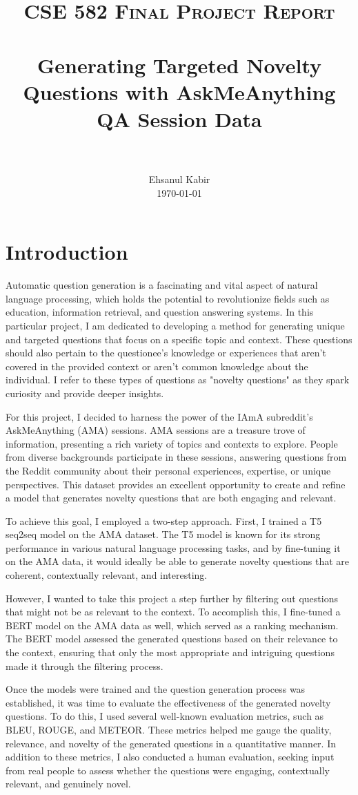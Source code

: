 \documentclass[paper=a4, fontsize=11pt]{scrartcl}
\title{
		\usefont{OT1}{bch}{b}{n}
		\normalfont \normalsize \textsc{CSE 582 Final Project Report} \\ [25pt]
		\horrule{0.5pt} \\[0.4cm]
		\huge Generating Targeted Novelty Questions with AskMeAnything QA Session Data \\
		\horrule{2pt} \\[0.5cm]
}
\author{
		\normalfont 								\normalsize
        Ehsanul Kabir\\[-3pt]		\normalsize
        \today
}
\date{}
\numberwithin{equation}{section}		%
\numberwithin{figure}{section}			%
\numberwithin{table}{section}				%
\begin{document}
\maketitle
\section{Introduction}
Automatic question generation is a fascinating and vital aspect of natural language processing, which holds the potential to revolutionize fields such as education, information retrieval, and question answering systems. In this particular project, I am dedicated to developing a method for generating unique and targeted questions that focus on a specific topic and context. These questions should also pertain to the questionee's knowledge or experiences that aren't covered in the provided context or aren't common knowledge about the individual. I refer to these types of questions as "novelty questions" as they spark curiosity and provide deeper insights.

For this project, I decided to harness the power of the IAmA subreddit's AskMeAnything (AMA) sessions. AMA sessions are a treasure trove of information, presenting a rich variety of topics and contexts to explore. People from diverse backgrounds participate in these sessions, answering questions from the Reddit community about their personal experiences, expertise, or unique perspectives. This dataset provides an excellent opportunity to create and refine a model that generates novelty questions that are both engaging and relevant.

To achieve this goal, I employed a two-step approach. First, I trained a T5 seq2seq model on the AMA dataset. The T5 model is known for its strong performance in various natural language processing tasks, and by fine-tuning it on the AMA data, it would ideally be able to generate novelty questions that are coherent, contextually relevant, and interesting.

However, I wanted to take this project a step further by filtering out questions that might not be as relevant to the context. To accomplish this, I fine-tuned a BERT model on the AMA data as well, which served as a ranking mechanism. The BERT model assessed the generated questions based on their relevance to the context, ensuring that only the most appropriate and intriguing questions made it through the filtering process.

Once the models were trained and the question generation process was established, it was time to evaluate the effectiveness of the generated novelty questions. To do this, I used several well-known evaluation metrics, such as BLEU, ROUGE, and METEOR. These metrics helped me gauge the quality, relevance, and novelty of the generated questions in a quantitative manner. In addition to these metrics, I also conducted a human evaluation, seeking input from real people to assess whether the questions were engaging, contextually relevant, and genuinely novel.
\end{document}
